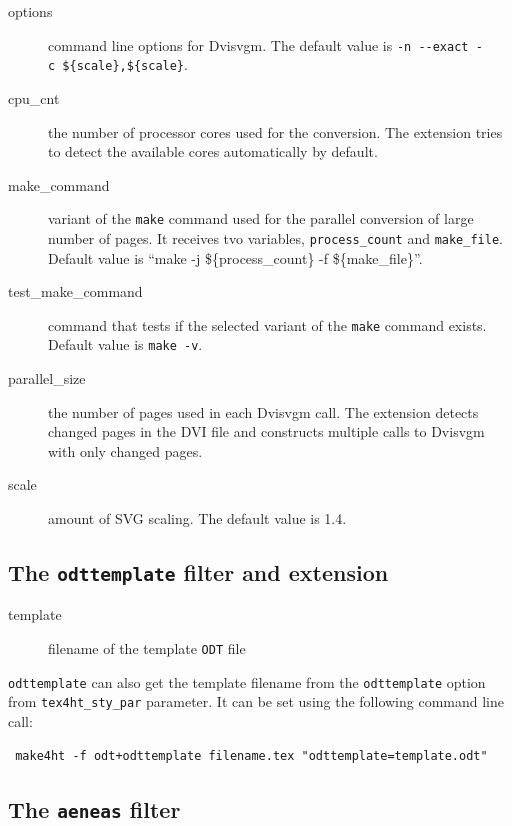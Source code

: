 \begin{description}
\item[options]
command line options for Dvisvgm. The default value is
\texttt{-n\ -\/-exact\ -c\ \$\{scale\},\$\{scale\}}.
\item[cpu\_cnt]
the number of processor cores used for the conversion. The extension
tries to detect the available cores automatically by default.
\item[make\_command]
variant of the \texttt{make} command used for the parallel conversion of
large number of pages. It receives tvo variables,
\texttt{process\_count} and \texttt{make\_file}. Default value is ``make
-j \$\{process\_count\} -f \$\{make\_file\}''.
\item[test\_make\_command]
command that tests if the selected variant of the \texttt{make} command
exists. Default value is \texttt{make\ -v}.
\item[parallel\_size]
the number of pages used in each Dvisvgm call. The extension detects
changed pages in the DVI file and constructs multiple calls to Dvisvgm
with only changed pages.
\item[scale]
amount of SVG scaling. The default value is 1.4.
\end{description}

\subsection{\texorpdfstring{The \texttt{odttemplate} filter and
extension}{The odttemplate filter and extension}}\label{the-odttemplate-filter-and-extension}

\begin{description}
\item[template]
filename of the template \texttt{ODT} file
\end{description}

\texttt{odttemplate} can also get the template filename from the
\texttt{odttemplate} option from \texttt{tex4ht\_sty\_par} parameter. It
can be set using the following command line call:

\begin{verbatim}
 make4ht -f odt+odttemplate filename.tex "odttemplate=template.odt"
\end{verbatim}

\subsection{\texorpdfstring{The \texttt{aeneas}
filter}{The aeneas filter}}\label{the-aeneas-filter}

